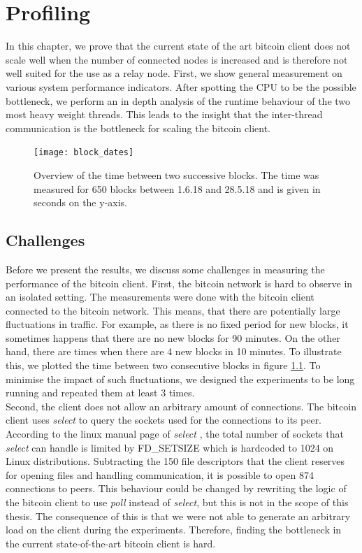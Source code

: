 \chapter{\label{profiling}Profiling}
In this chapter, we prove that the current state of the art bitcoin client does not scale well when the number of connected nodes is increased and is therefore not well suited for the use as a relay node. First, we show general measurement on various system performance indicators. After spotting the CPU to be the possible bottleneck, we perform an in depth analysis of the runtime behaviour of the two most heavy weight threads. This leads to the insight that the inter-thread communication is the bottleneck for scaling the bitcoin client.

\begin{figure}[!hbt]
\begin{center}
\texttt{[image: block\_dates]}
\caption[Overview of the time between two successive bitcoin blocks.]{Overview of the time between two successive blocks. The time was measured for 650 blocks between 1.6.18 and 28.5.18 and is given in seconds on the y-axis. \label{figure:blockDates}}
\end{center}
\end{figure}

\section{Challenges \label{sec:measuringDifficutlies}}
Before we present the results, we discuss some challenges in measuring the performance of the bitcoin client. First, the bitcoin network is hard to observe in an isolated setting. The measurements were done with the bitcoin client connected to the bitcoin network. This means, that there are potentially large fluctuations in traffic. For example, as there is no fixed period for new blocks, it sometimes happens that there are no new blocks for 90 minutes. On the other hand, there are times when there are 4 new blocks in 10 minutes. To illustrate this, we plotted the time between two consecutive blocks in figure \ref{figure:blockDates}. To minimise the impact of such fluctuations, we designed the experiments to be long running and repeated them at least 3 times.\\
Second, the client does not allow an arbitrary amount of connections. The bitcoin client uses \textit{select} to query the sockets used for the connections to its peer. According to the linux manual page of \textit{select} \cite{select}, the total number of sockets that \textit{select} can handle is limited by FD\_SETSIZE which is hardcoded to 1024 on Linux distributions. Subtracting the 150 file descriptors that the client reserves for opening files and handling communication, it is possible to open 874 connections to peers. This behaviour could be changed by rewriting the logic of the bitcoin client to use \textit{poll} instead of \textit{select}, but this is not in the scope of this thesis. The consequence of this is that we were not able to generate an arbitrary load on the client during the experiments. Therefore, finding the bottleneck in the current state-of-the-art bitcoin client is hard.



